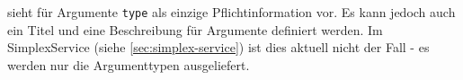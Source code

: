

 sieht für Argumente \texttt{type} als einzige Pflichtinformation vor\rfgfrjfn. Es kann jedoch auch ein Titel und eine Beschreibung für Argumente definiert werden.  Im SimplexService (siehe \ref{sec:simplex-service}) ist dies aktuell nicht der Fall - es werden nur die Argumenttypen ausgeliefert.

